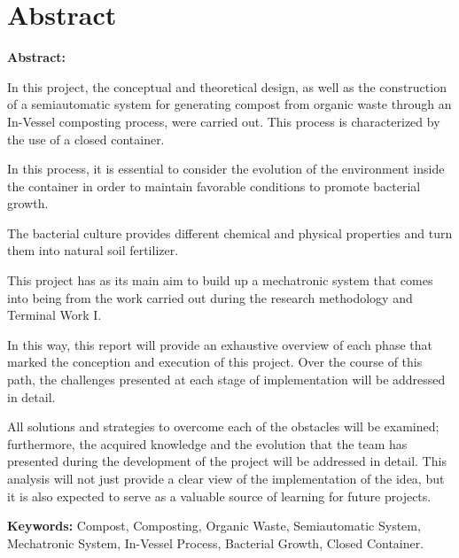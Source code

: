 \chapter{Abstract}

\textbf{Abstract:}

In this project, the conceptual and theoretical design, as well as the construction of a semiautomatic system for generating compost from organic waste through an In-Vessel composting process, were carried out. This process is characterized by the use of a closed container.

In this process, it is essential to consider the evolution of the environment inside the container in order to maintain favorable conditions to promote bacterial growth.

The bacterial culture provides different chemical and physical properties and turn them into natural soil fertilizer.

This project has as its main aim to build up a mechatronic system that comes into being from the work carried out during the research methodology and Terminal Work I.

In this way, this report will provide an exhaustive overview of each phase that marked the conception and execution of this project. Over the course of this path, the challenges presented at each stage of implementation will be addressed in detail.

All solutions and strategies to overcome each of the obstacles will be examined; furthermore, the acquired knowledge and the evolution that the team has presented during the development of the project will be addressed in detail. This analysis will not just provide a clear view of the implementation of the idea, but it is also expected to serve as a valuable source of learning for future projects.




\textbf{Keywords:} Compost, Composting, Organic Waste, Semiautomatic System, Mechatronic System, In-Vessel Process, Bacterial Growth, Closed Container. 

\endinput 